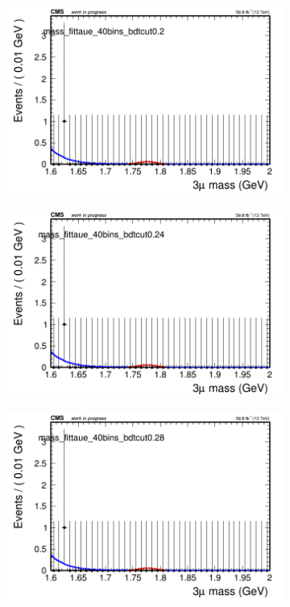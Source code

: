 \begin{figure}[H]
\begin{subfigure}{0.2\textwidth}
        \caption{}
    \end{subfigure}
    \begin{subfigure}{0.2\textwidth}
        \includegraphics[width=\textwidth]{power_law/plots/taue/massfit_taue_40bins_bdtcut0.2.png}
        \caption{}
    \end{subfigure}
    \begin{subfigure}{0.2\textwidth}
        \includegraphics[width=\textwidth]{power_law/plots/taue/massfit_taue_40bins_bdtcut0.24.png}
        \caption{}
    \end{subfigure}
    \begin{subfigure}{0.2\textwidth}
        \includegraphics[width=\textwidth]{power_law/plots/taue/massfit_taue_40bins_bdtcut0.28.png}

\end{subfigure}
\end{figure}
